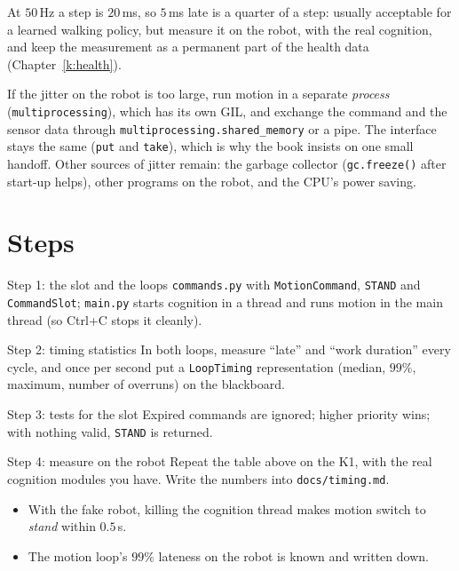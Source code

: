 At $50$\,Hz a step is $20$\,ms, so $5$\,ms late is a quarter of a step: usually acceptable for a learned walking policy, but measure it on the robot, with the real cognition, and keep the measurement as a permanent part of the health data (Chapter~\ref{k:health}).

\begin{aibox}
If the jitter on the robot is too large, run motion in a separate \emph{process} (\texttt{multiprocessing}), which has its own GIL, and exchange the command and the sensor data through \texttt{multiprocessing.shared\_memory} or a pipe. The interface stays the same (\texttt{put} and \texttt{take}), which is why the book insists on one small handoff. Other sources of jitter remain: the garbage collector (\verb!gc.freeze()! after start-up helps), other programs on the robot, and the CPU's power saving.
\end{aibox}

\section*{Steps}
\begin{stepbox}{Step 1: the slot and the loops}
\texttt{commands.py} with \texttt{MotionCommand}, \texttt{STAND} and \texttt{CommandSlot}; \texttt{main.py} starts cognition in a thread and runs motion in the main thread (so Ctrl+C stops it cleanly).
\end{stepbox}
\begin{stepbox}{Step 2: timing statistics}
In both loops, measure ``late'' and ``work duration'' every cycle, and once per second put a \texttt{LoopTiming} representation (median, $99\%$, maximum, number of overruns) on the blackboard.
\end{stepbox}
\begin{stepbox}{Step 3: tests for the slot}
Expired commands are ignored; higher priority wins; with nothing valid, \texttt{STAND} is returned.
\end{stepbox}
\begin{stepbox}{Step 4: measure on the robot}
Repeat the table above on the K1, with the real cognition modules you have. Write the numbers into \texttt{docs/timing.md}.
\end{stepbox}

\begin{checkbox}
\begin{itemize}[nosep]
  \item With the fake robot, killing the cognition thread makes motion switch to \emph{stand} within $0.5$\,s.
  \item The motion loop's $99\%$ lateness on the robot is known and written down.
\end{itemize}
\end{checkbox}

